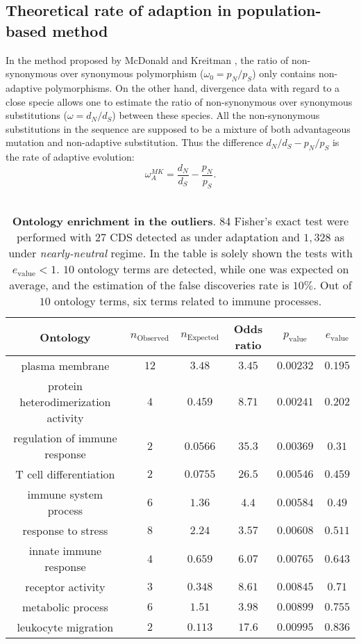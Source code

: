 \documentclass[10pt]{article}
\begin{document}
\begin{multicols}{2}
	\subsection*{Theoretical rate of adaption in population-based method}
	In the method proposed by McDonald and Kreitman \cite{McDonald1991}, the ratio of non-synonymous over synonymous polymorphism ($\omega_{0}=p_N/p_S$) only contains non-adaptive polymorphisms. On the other hand, divergence data with regard to a close specie allows one to estimate the ratio of non-synonymous over synonymous substitutions ($\omega=d_N/d_S$) between these species. All the non-synonymous substitutions in the sequence are supposed to be a mixture of both advantageous mutation and non-adaptive substitution. Thus the difference $d_N/d_S - p_N/p_S$ is the rate of adaptive evolution:
	\begin{equation*}
	\omega_A^{MK}=\dfrac{d_N}{d_S} - \dfrac{p_N}{p_S}.
	\end{equation*}\\
		\begin{table*}[hb!]
		\centering
		\begin{adjustbox}{width = 1\textwidth}
			\small\begin{tabular}{|c|c|c|c|c|c|}
				\hline
				Ontology & $n_{\mathrm{Observed}}$ & $n_{\mathrm{Expected}}$ & Odds ratio & $p_{\mathrm{value}}$ & $e_{\mathrm{value}}$\\
				\hline
				plasma membrane & $12$ & $3.48$ & $3.45$ & $0.00232$ & $0.195$\\
				protein heterodimerization activity & $4$ & $0.459$ & $8.71$ & $0.00241$ & $0.202$\\
				regulation of immune response & $2$ & $0.0566$ & $35.3$ & $0.00369$ & $0.31$\\
				T cell differentiation & $2$ & $0.0755$ & $26.5$ & $0.00546$ & $0.459$\\
				immune system process & $6$ & $1.36$ & $4.4$ & $0.00584$ & $0.49$\\
				response to stress & $8$ & $2.24$ & $3.57$ & $0.00608$ & $0.511$\\
				innate immune response & $4$ & $0.659$ & $6.07$ & $0.00765$ & $0.643$\\
				receptor activity & $3$ & $0.348$ & $8.61$ & $0.00845$ & $0.71$\\
				metabolic process & $6$ & $1.51$ & $3.98$ & $0.00899$ & $0.755$\\
				leukocyte migration & $2$ & $0.113$ & $17.6$ & $0.00995$ & $0.836$\\
				\hline
			\end{tabular}
		\end{adjustbox}
		\caption{\textbf{Ontology enrichment in the outliers}. 84 Fisher's exact test were performed with $27$ CDS detected as under adaptation and $1,328$ as under \textit{nearly-neutral} regime. In the table is solely shown the tests with $e_{\mathrm{value}} < 1$. $10$ ontology terms are detected, while one was expected on average, and the estimation of the false discoveries rate is $10\%$. Out of $10$ ontology terms, six terms related to immune processes. \label{fig:ontology}}
	\end{table*}


\end{multicols}
\end{document}
